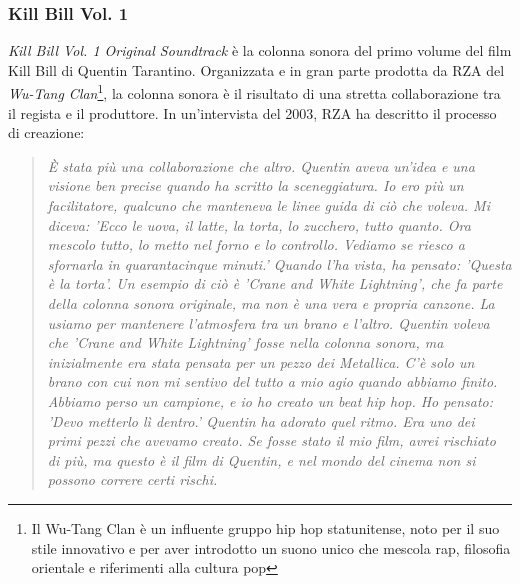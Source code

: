 \documentclass[12pt]{article} %
\begin{document}
        \normalsize
        \subsubsection*{Kill Bill Vol. 1}
        \begin{flushleft}
            \textit{Kill Bill Vol. 1 Original Soundtrack} è la colonna sonora del primo volume del film Kill Bill di Quentin Tarantino. Organizzata e in gran parte prodotta da RZA del \textit{Wu-Tang Clan}\footnote{Il Wu-Tang Clan è un influente gruppo hip hop statunitense, noto per il suo stile innovativo e per aver introdotto un suono unico che mescola rap, filosofia orientale e riferimenti alla cultura pop}, la colonna sonora è il risultato di una stretta collaborazione tra il regista e il produttore. In un'intervista del 2003, RZA ha descritto il processo di creazione:
            \begin{quote}\textit{
                È stata più una collaborazione che altro. Quentin aveva un'idea e una visione ben precise quando ha scritto la sceneggiatura. Io ero più un facilitatore, qualcuno che manteneva le linee guida di ciò che voleva. Mi diceva: 'Ecco le uova, il latte, la torta, lo zucchero, tutto quanto. Ora mescolo tutto, lo metto nel forno e lo controllo. Vediamo se riesco a sfornarla in quarantacinque minuti.' Quando l'ha vista, ha pensato: 'Questa è la torta'. Un esempio di ciò è 'Crane and White Lightning', che fa parte della colonna sonora originale, ma non è una vera e propria canzone. La usiamo per mantenere l'atmosfera tra un brano e l'altro. Quentin voleva che 'Crane and White Lightning' fosse nella colonna sonora, ma inizialmente era stata pensata per un pezzo dei Metallica. C'è solo un brano con cui non mi sentivo del tutto a mio agio quando abbiamo finito. Abbiamo perso un campione, e io ho creato un beat hip hop. Ho pensato: 'Devo metterlo lì dentro.' Quentin ha adorato quel ritmo. Era uno dei primi pezzi che avevamo creato. Se fosse stato il mio film, avrei rischiato di più, ma questo è il film di Quentin, e nel mondo del cinema non si possono correre certi rischi.
            }\end{quote}
        \end{flushleft}
            \small
\end{document}
